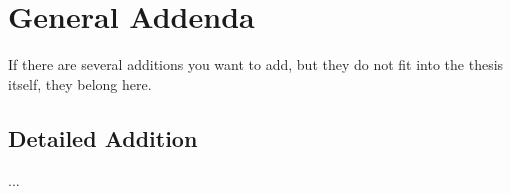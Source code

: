 

\chapter{General Addenda}

If there are several additions you want to add, but they do not fit into the thesis itself, they belong here.

\section{Detailed Addition}

...

